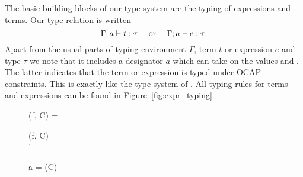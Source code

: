The basic building blocks of our type system are the typing of expressions and
terms. Our type relation is written
\begin{equation}
  \mbox{$\Gamma;a\vdash t:\tau$} \quad \text{ or } \quad
  \mbox{$\Gamma;a\vdash e:\tau$}. \notag
\end{equation}
Apart from the usual parts of typing environment $\Gamma$, term $t$ or
expression $e$ and type $\tau$ we note that it includes a designator $a$ which
can take on the values \nocap{} and \ocap{}. The latter indicates that the term
or expression is typed under OCAP constraints. This is exactly like the type
system of \LaCasa{}. All typing rules for terms and expressions can be found in
Figure~\ref{fig:expr_typing}.

\begin{figure}[t]
  \centering
    { \andalso {}}
    {}

    \vspace{0.5em}


    \vspace{0.5em}

    
    \vspace{0.5em}


    \vspace{0.5em}

    { \andalso \ftype(f, C) = \tau }
    {}
    
    \vspace{0.5em}

    { \andalso \ftype(f, C) = \tau \\
     \andalso \tau' \stof \tau }
    {}

    \vspace{0.5em}

    {a = \ocap \Longrightarrow \ocap(C)}
    {}


\end{figure}

